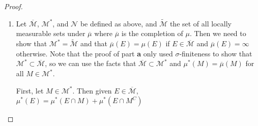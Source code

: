 \documentclass{article}
\theoremstyle{definition}
\begin{document}
\begin{proof}
\begin{enumerate}[label=\textbf{\alph*.}]
		      Now suppose $M \in \overline{\mathscr{M}}$, so $M = E \cup F$ for some $E \in \mathscr{M}$ and $F \in X$ such that $F \subset N$ for some $N \in \mathscr{N}$.
		      Given $G \subset X$ such that $\mu^*(G) < \infty$, we want to show that \begin{equation*}
			      \mu^*(G) \geq \mu^*(G \cap M) + \mu^*(G \cap M^C).
		      \end{equation*}
		      This is straightforward: \begin{align*}
			      \mu^*(G \cap M) + \mu^*(G \cap M^C) & = \mu^*(G \cap (E \cup F)) + \mu^*(G \cap (E \cup F)^C)          \\
			                                          & = \mu^*((G \cap E) \cup (G \cap F)) + \mu^*(G \cap E^C \cap F^C) \\
			                                          & \leq \mu^*(G \cap E) + \mu^*(G \cap F) + \mu^*(G \cap E^C)       \\
			                                          & = \mu^*(G \cap E) + \mu^*(G \cap E^C)                            \\
			                                          & = \mu^*(G)
		      \end{align*}
		      where the final equation follows because $E$ is $\mu^*$-measurable.

		      Finally, we need $\overline{\mu}(M) = \mu(M)$ for $M \in \mathscr{M}$.
		      This follows immediately from (1.13), taking $\mu$ to be $\mu_0$ and $\mathscr{M}$ to be $\mathscr{A}$.
		\item Let $\overline{\mathscr{M}}$, $\mathscr{M}^*$, and $\mathscr{N}$ be defined as above, and $\widetilde{\mathscr{M}}$ the set of all locally measurable sets under $\overline{\mu}$ where $\overline{\mu}$ is the completion of $\mu$.
		      Then we need to show that $\mathscr{M}^* = \widetilde{\mathscr{M}}$ and that $\overline{\mu}(E) = \mu(E)$ if $E \in \overline{\mathscr{M}}$ and $\overline{\mu}(E) = \infty$ otherwise.
		      Note that the proof of part \textbf{a} only used $\sigma$-finiteness to show that $\mathscr{M}^* \subset \overline{\mathscr{M}}$, so we can use the facts that $\overline{\mathscr{M}} \subset \mathscr{M}^*$ and $\mu^*(M) = \overline{\mu}(M)$ for all $M \in \mathscr{M}^*$.

		      First, let $M \in \mathscr{M}^*$.
		      Then given $E \in \overline{\mathscr{M}}$, $\mu^*(E) = \mu^*(E \cap M) + \mu^*(E \cap M^C)$


\end{enumerate}
\end{proof}
\end{document}
